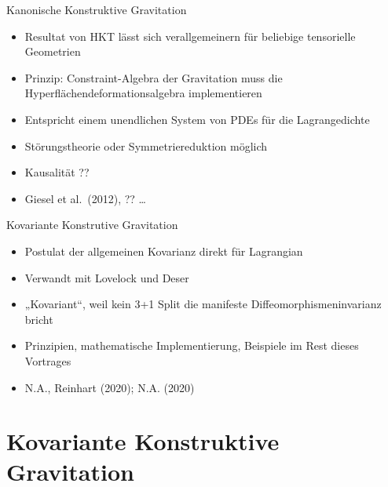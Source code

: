 \documentclass{beamer}
\begin{document}
    \begin{frame}{Kanonische Konstruktive Gravitation}
        \begin{itemize}
            \item Resultat von HKT lässt sich verallgemeinern für beliebige tensorielle Geometrien \pause
            \item Prinzip: Constraint-Algebra der Gravitation muss die
            Hyperflächendeformationsalgebra implementieren \pause
            \item Entspricht einem unendlichen System von PDEs für die Lagrangedichte \pause
            \item Störungstheorie oder Symmetriereduktion möglich \pause
            \item Kausalität ?? \pause
            \item Giesel et al.\ (2012), ?? \ldots
        \end{itemize}
    \end{frame}

    \begin{frame}{Kovariante Konstrutive Gravitation}
        \begin{itemize}
            \item Postulat der allgemeinen Kovarianz direkt für Lagrangian \pause
            \item Verwandt mit Lovelock und Deser \pause
            \item „Kovariant“, weil kein 3+1 Split die manifeste Diffeomorphismeninvarianz bricht \pause
            \item Prinzipien, mathematische Implementierung, Beispiele im Rest dieses Vortrages \pause
            \item N.A., Reinhart (2020); N.A. (2020)
        \end{itemize}
    \end{frame}


    \section{Kovariante Konstruktive Gravitation}\label{sec:covariant-constructive-gravity}
\end{document}
